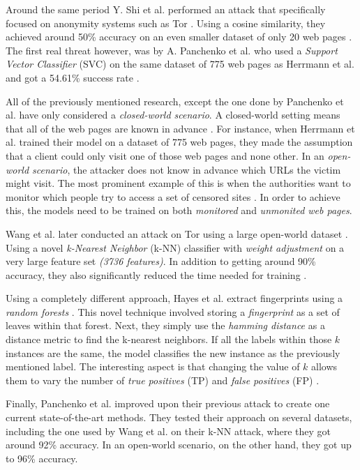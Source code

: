 Around the same period Y. Shi et al. performed an attack that specifically focused on anonymity systems such as Tor \cite{shi2009fingerprinting}.
Using a cosine similarity, they achieved around 50\% accuracy on an even smaller dataset of only 20 web pages \cite{shi2009fingerprinting}.
The first real threat however, was by A. Panchenko et al. who used a \textit{Support Vector Classifier} (SVC) on the same dataset of 775 web pages as Herrmann et al.
and got a 54.61\% success rate \cite{herrmann2009website, panchenko1}.

All of the previously mentioned research, except the one done by Panchenko et al. have only considered a \textit{closed-world scenario}.
A closed-world setting means that all of the web pages are known in advance \cite{panchenko1}.
For instance, when Herrmann et al. trained their model on a dataset of 775 web pages, they made the assumption that a client could only visit one of
those web pages and none other.
In an \textit{open-world scenario}, the attacker does not know in advance which URLs the victim might visit.
The most prominent example of this is when the authorities want to monitor which people try to access a set of censored sites \cite{panchenko1}.
In order to achieve this, the models need to be trained on both \textit{monitored} and \textit{unmonited web pages}.

Wang et al. later conducted an attack on Tor using a large open-world dataset \cite{wang_cai_johnson_nithyanand_goldberg_2014}.
Using a novel \textit{k-Nearest Neighbor} (k-NN) classifier with \textit{weight adjustment} on a very large feature set \textit{(3736 features)}.
In addition to getting around 90\% accuracy, they also significantly reduced the time needed for training \cite{wang_cai_johnson_nithyanand_goldberg_2014}.

Using a completely different approach, Hayes et al. extract fingerprints using a \textit{random forests} \cite{kfingerprinting}.
This novel technique involved storing a \textit{fingerprint} as a set of leaves within that forest.
Next, they simply use the \textit{hamming distance} as a distance metric to find the k-nearest neighbors.
If all the labels within those $k$ instances are the same, the model classifies the new instance as the previously mentioned label.
The interesting aspect is that changing the value of $k$ allows them to vary the number of \textit{true positives} (TP) and \textit{false positives} (FP) \cite{kfingerprinting}.

Finally, Panchenko et al. improved upon their previous attack to create one current state-of-the-art methods. They tested their approach on several datasets,
including the one used by Wang et al. on their k-NN attack, where they got around 92\% accuracy.
In an open-world scenario, on the other hand, they got up to 96\% accuracy.

